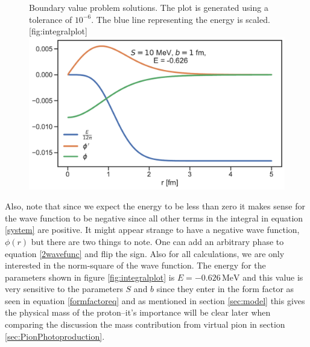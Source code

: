 \begin{figure}[H]
	\begin{sidecaption}{Boundary value problem solutions. The plot is generated using a tolerance of $10^{-6}$. The blue line representing the energy is scaled.}[fig:integralplot]
		\includegraphics[width=\linewidth]{Figures/Integralplot.pdf}
	\end{sidecaption}
\end{figure}
Also, note that since we expect the energy to be less than zero it makes sense for the wave function to be negative since all other terms in the integral in equation \eqref{system} are positive. It might appear strange to have a negative wave function, $\phi(r)$ but there are two things to note. One can add an arbitrary phase to equation \eqref{2wavefunc} and flip the sign. Also for all calculations, we are only interested in the norm-square of the wave function.  The energy for the parameters shown in figure \ref{fig:integralplot} is $E = -0.626 \, \text{MeV}$ and this value is very sensitive to the parameters $S$ and $b$ since they enter in the form factor as seen in equation \eqref{formfactoreq} and as mentioned in section \ref{sec:model} this gives the physical mass of the proton--it's importance will be clear later when comparing the discussion the mass contribution from virtual pion in section \ref{sec:PionPhotoproduction}.

